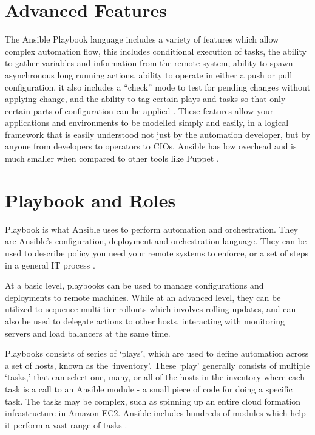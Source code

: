 \documentclass[9pt,twocolumn,twoside]{../../styles/osajnl}
\begin{document}
\section{Advanced Features}

The Ansible Playbook language includes a variety of features which
allow complex automation flow, this includes conditional execution of
tasks, the ability to gather variables and information from the remote
system, ability to spawn asynchronous long running actions, ability to
operate in either a push or pull configuration, it also includes a
“check” mode to test for pending changes without applying change, and
the ability to tag certain plays and tasks so that only certain parts
of configuration can be applied \cite{www-ansible3}. These features allow your
applications and environments to be modelled simply and easily, in a
logical framework that is easily understood not just by the automation
developer, but by anyone from developers to operators to CIOs. Ansible
has low overhead and is much smaller when compared to other tools like
Puppet \cite{www-ansible4}.

\section{Playbook and Roles}

Playbook is what Ansible uses to perform automation and
orchestration. They are Ansible's configuration, deployment and
orchestration language. They can be used to describe policy you need
your remote systems to enforce, or a set of steps in a general IT
process \cite{www-ansible5}.

At a basic level, playbooks can be used to manage configurations and
deployments to remote machines. While at an advanced level, they can
be utilized to sequence multi-tier rollouts which involves rolling
updates, and can also be used to delegate actions to other hosts,
interacting with monitoring servers and load balancers at the same time.

Playbooks consists of series of ‘plays’, which are used to define
automation across a set of hosts, known as the ‘inventory’. These
‘play’ generally consists of multiple ‘tasks,’ that can select one,
many, or all of the hosts in the inventory where each task is a call
to an Ansible module - a small piece of code for doing a specific
task. The tasks may be complex, such as spinning up an entire cloud
formation infrastructure in Amazon EC2. Ansible includes hundreds of
modules which help it perform a vast range of tasks
\cite{www-ansible}.
\end{document}
